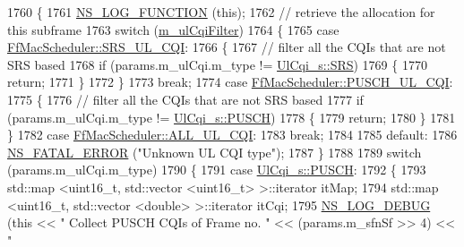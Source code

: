\begin{DoxyCode}
1760 \{
1761   \hyperlink{log-macros-disabled_8h_a90b90d5bad1f39cb1b64923ea94c0761}{NS\_LOG\_FUNCTION} (\textcolor{keyword}{this});
1762 \textcolor{comment}{// retrieve the allocation for this subframe}
1763   \textcolor{keywordflow}{switch} (\hyperlink{classns3_1_1FfMacScheduler_adae16e66a1c4231da80a1221297442cf}{m\_ulCqiFilter})
1764     \{
1765     \textcolor{keywordflow}{case} \hyperlink{classns3_1_1FfMacScheduler_aa47a9eb25f2c558c825b0be645304a52af2e0df473ba2c8f9cb131cb760591aed}{FfMacScheduler::SRS\_UL\_CQI}:
1766       \{
1767         \textcolor{comment}{// filter all the CQIs that are not SRS based}
1768         \textcolor{keywordflow}{if} (params.m\_ulCqi.m\_type != \hyperlink{structns3_1_1UlCqi__s_aece9e5ebea42eb9ff1744c72c8459b57af4b6dba4243636562c910c4d4761dd7e}{UlCqi\_s::SRS})
1769           \{
1770             \textcolor{keywordflow}{return};
1771           \}
1772       \}
1773       \textcolor{keywordflow}{break};
1774     \textcolor{keywordflow}{case} \hyperlink{classns3_1_1FfMacScheduler_aa47a9eb25f2c558c825b0be645304a52a4a833bc779439b15bd904e1dd8eaa563}{FfMacScheduler::PUSCH\_UL\_CQI}:
1775       \{
1776         \textcolor{comment}{// filter all the CQIs that are not SRS based}
1777         \textcolor{keywordflow}{if} (params.m\_ulCqi.m\_type != \hyperlink{structns3_1_1UlCqi__s_aece9e5ebea42eb9ff1744c72c8459b57a9716b20a3095c473ae3fde1eb5d0bb63}{UlCqi\_s::PUSCH})
1778           \{
1779             \textcolor{keywordflow}{return};
1780           \}
1781       \}
1782     \textcolor{keywordflow}{case} \hyperlink{classns3_1_1FfMacScheduler_aa47a9eb25f2c558c825b0be645304a52a84059a597c72335f0a5963c3efcbda71}{FfMacScheduler::ALL\_UL\_CQI}:
1783       \textcolor{keywordflow}{break};
1784 
1785     \textcolor{keywordflow}{default}:
1786       \hyperlink{group__fatal_ga5131d5e3f75d7d4cbfd706ac456fdc85}{NS\_FATAL\_ERROR} (\textcolor{stringliteral}{"Unknown UL CQI type"});
1787     \}
1788 
1789   \textcolor{keywordflow}{switch} (params.m\_ulCqi.m\_type)
1790     \{
1791     \textcolor{keywordflow}{case} \hyperlink{structns3_1_1UlCqi__s_aece9e5ebea42eb9ff1744c72c8459b57a9716b20a3095c473ae3fde1eb5d0bb63}{UlCqi\_s::PUSCH}:
1792       \{
1793         std::map <uint16\_t, std::vector <uint16\_t> >::iterator itMap;
1794         std::map <uint16\_t, std::vector <double> >::iterator itCqi;
1795         \hyperlink{group__logging_ga413f1886406d49f59a6a0a89b77b4d0a}{NS\_LOG\_DEBUG} (\textcolor{keyword}{this} << \textcolor{stringliteral}{" Collect PUSCH CQIs of Frame no. "} << (params.m\_sfnSf >> 4) << \textcolor{stringliteral}{"
}
\end{DoxyCode}

